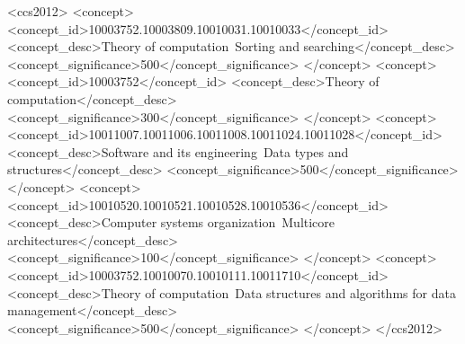 \documentclass[acmtog]{acmart}
\begin{document}
\begin{abstract}
Much of the copious literature on the subject of sorting has concentrated on minimizing the number of comparisons and/or exchanges/copies.
However, a more appropriate yardstick for the performance of sorting algorithms is based on the total number of array accesses that are required (the "work").
For a sort that is based on divide-and-conquer (including iterative variations on that theme), we can divide the work into linear, i.e. $\textbf{O}(N)$, work and linearithmic, i.e. $\textbf{O}(N log N)$, work.
An algorithm that moves work from the linearithmic phase to the linear phase may be able to reduce the total number of array accesses and, indirectly, processing time.
This paper describes an approach to sorting which reduces the number of \emph{expensive} comparisons in the linearithmic phase as much as possible by substituting inexpensive comparisons.
In Java, the two system sorts are dual-pivot quicksort (for primitives) and Timsort for objects.
We demonstrate that a combination of these two algorithms can run significantly faster than either algorithm alone for the types of objects which are expensive to compare.
We call this improved sorting algorithm Huskysort.
\end{abstract}



\begin{CCSXML}
<ccs2012>
   <concept>
       <concept_id>10003752.10003809.10010031.10010033</concept_id>
       <concept_desc>Theory of computation~Sorting and searching</concept_desc>
       <concept_significance>500</concept_significance>
       </concept>
   <concept>
       <concept_id>10003752</concept_id>
       <concept_desc>Theory of computation</concept_desc>
       <concept_significance>300</concept_significance>
       </concept>
   <concept>
       <concept_id>10011007.10011006.10011008.10011024.10011028</concept_id>
       <concept_desc>Software and its engineering~Data types and structures</concept_desc>
       <concept_significance>500</concept_significance>
       </concept>
   <concept>
       <concept_id>10010520.10010521.10010528.10010536</concept_id>
       <concept_desc>Computer systems organization~Multicore architectures</concept_desc>
       <concept_significance>100</concept_significance>
       </concept>
   <concept>
       <concept_id>10003752.10010070.10010111.10011710</concept_id>
       <concept_desc>Theory of computation~Data structures and algorithms for data management</concept_desc>
       <concept_significance>500</concept_significance>
       </concept>
 </ccs2012>
\end{CCSXML}
\end{document}
